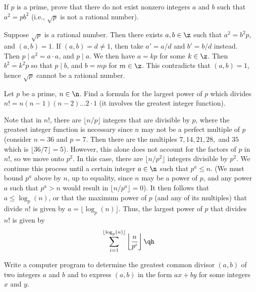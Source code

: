 \begin{problems}
\begin{sol}
    \end{sol}
    \item If $p$ is a prime, prove that there do not exist nonzero integers $a$ and $b$ such that $a^2 = pb^2$ (i.e., $\sqrt p$ is not a rational number).
    \begin{sol}
        Suppose $\sqrt p$ is a rational number. Then there exists $a, b \in \z$ such that $a^2 = b^2p$, and $(a, b) = 1$. If $(a, b) = d \neq 1$, then take $a' = a/d$ and $b' = b/d$ instead. Then $p \mid a^2 = a \cdot a$, and $p \mid a$. We then have $a = kp$ for some $k \in \z$. Then $b^2 = k^2p$ so that $p \mid b$, and $b = mp$ for $m \in \z$. This contradicts that $(a, b) = 1$, hence $\sqrt p$ cannot be a rational number.
    \end{sol}
    \item Let $p$ be a prime, $n \in \n$. Find a formula for the largest power of $p$ which divides $n! = n(n - 1)(n - 2) \ldots 2 \cdot 1$ (it involves the greatest integer function).
    \label{ex0.2.8}
    \begin{sol}
        Note that in $n!$, there are $\lfloor n/p \rfloor$ integers that are divisible by $p$, where the greatest integer function is necessary since $n$ may not be a perfect multiple of $p$ (consider $n = 36$ and $p = 7$. Then there are the multiples $7, 14, 21, 28,$ and $35$ which is $\lfloor 36/7 \rfloor = 5$). However, this alone does not account for the factors of $p$ in $n!$, so we move onto $p^2$. In this case, there are $\lfloor n/p^2 \rfloor$ integers divisible by $p^2$. We continue this process until a certain integer $a \in \n$ such that $p^a \leq n$. (We must bound $p^a$ above by $n$, up to equality, since $n$ may be a power of $p$, and any power $a$ such that $p^a > n$ would result in $\lfloor n/p^a\rfloor= 0$). It then follows that $a \leq \log_p(n)$, or that the maximum power of $p$ (and any of its multiples) that divide $n!$ is given by $a = \lfloor\log_p(n)\rfloor$. Thus, the largest power of $p$ that divides $n!$ is given by
        \[\sum_{i = 1}^{\lfloor \log_p(n)\rfloor} \left\lfloor\frac{n}{p^i}\right\rfloor \qh\]
    \end{sol}
    \item Write a computer program to determine the greatest common divisor $(a, b)$ of two integers $a$ and $b$ and to express $(a, b)$ in the form $ax + by$ for some integers $x$ and $y$.
    \begin{breakablealgorithm}
        \begin{algorithmic}[1]
            

\end{algorithmic}
\end{breakablealgorithm}
\end{problems}

